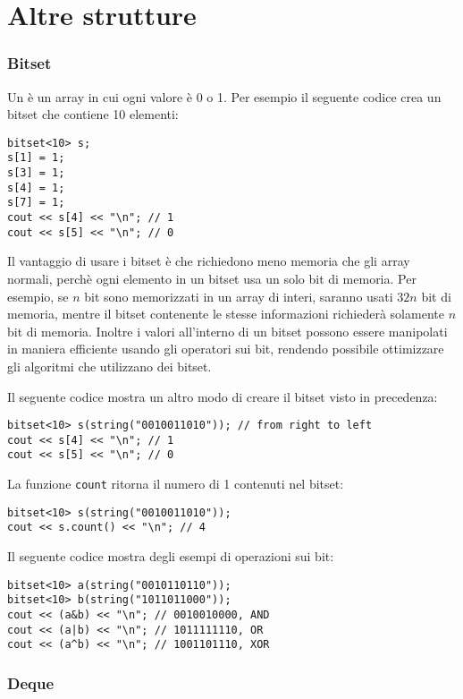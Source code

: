 \section{Altre strutture}

\subsubsection{Bitset}


Un  è un array in cui ogni valore
è 0 o 1. 
Per esempio il seguente codice crea
un bitset che contiene 10 elementi:
\begin{lstlisting}
bitset<10> s;
s[1] = 1;
s[3] = 1;
s[4] = 1;
s[7] = 1;
cout << s[4] << "\n"; // 1
cout << s[5] << "\n"; // 0
\end{lstlisting}

Il vantaggio di usare i bitset è che 
richiedono meno memoria che gli array normali,
perchè ogni elemento in un bitset usa
un solo bit di memoria.
Per esempio, se $n$ bit sono memorizzati in un
array di interi, saranno usati $32n$ bit di memoria,
mentre il bitset contenente le stesse informazioni
richiederà solamente $n$ bit di memoria.
Inoltre i valori all'interno di un bitset 
possono essere manipolati in maniera efficiente
usando gli operatori sui bit,
rendendo possibile ottimizzare gli algoritmi
che utilizzano dei bitset.

Il seguente codice mostra un altro modo di creare il bitset
visto in precedenza:
\begin{lstlisting}
bitset<10> s(string("0010011010")); // from right to left
cout << s[4] << "\n"; // 1
cout << s[5] << "\n"; // 0
\end{lstlisting}

La funzione \texttt{count} ritorna il numero 
di 1 contenuti nel bitset:

\begin{lstlisting}
bitset<10> s(string("0010011010"));
cout << s.count() << "\n"; // 4
\end{lstlisting}

Il seguente codice mostra degli esempi di operazioni sui bit:
\begin{lstlisting}
bitset<10> a(string("0010110110"));
bitset<10> b(string("1011011000"));
cout << (a&b) << "\n"; // 0010010000, AND
cout << (a|b) << "\n"; // 1011111110, OR
cout << (a^b) << "\n"; // 1001101110, XOR
\end{lstlisting}

\subsubsection{Deque}


